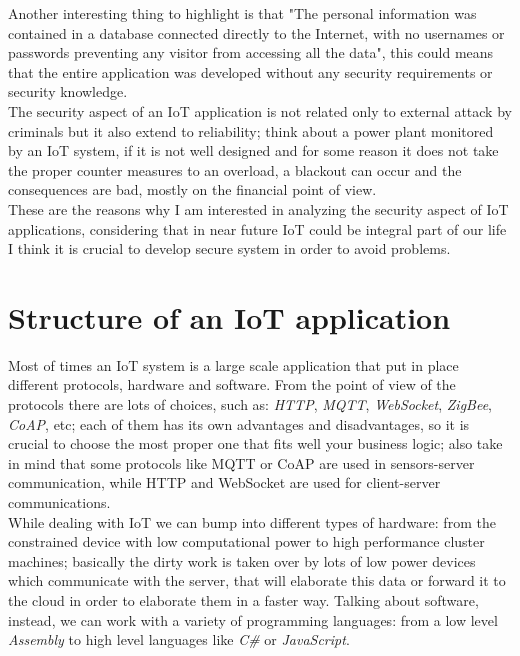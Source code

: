 \documentclass[12pt]{report}
\begin{document}
Another interesting thing to highlight is that "The personal information was contained in a database connected directly to the Internet, with no usernames or passwords preventing any visitor from accessing all the data", this could means that the entire application was developed without any security requirements or security knowledge.\\
 
The security aspect of an IoT application is not related only to external attack by criminals but it also extend to reliability; think about a power plant monitored by
an IoT system, if it is not well designed and for some reason it does not take the proper counter measures to an overload, a blackout can occur and the consequences are bad, mostly on the financial point of view.\\
These are the reasons why I am interested in analyzing the security aspect of IoT applications, considering that in near future
IoT could be integral part of our life I think it is crucial to develop secure system in order to avoid problems.


\section{Structure of an IoT application}
\bigskip
Most of times an IoT system is a large scale application that put in place different protocols, hardware and software.\newline
From the point of view of the protocols there are lots of choices, such as: \emph{HTTP}, \emph{MQTT}, \emph{WebSocket}, \emph{ZigBee}, \emph{CoAP}, etc; each of them has its own advantages and disadvantages, so it is crucial to choose the most proper one that fits well your business logic; also take in mind that some protocols like MQTT or CoAP are used in sensors-server communication, while HTTP and WebSocket
are used for client-server communications.\\

While dealing with IoT we can bump into different types of hardware: from the constrained device with low computational power to high performance cluster machines; basically the dirty work is taken over by lots of low power devices which communicate with the server,
that will elaborate this data or forward it to the cloud in order to elaborate them in a faster way.\newline
Talking about software, instead, we can work with a variety of programming languages: from a low level \emph{Assembly} to high level languages like \emph{C\#} or \emph{JavaScript}.\\
\end{document}
